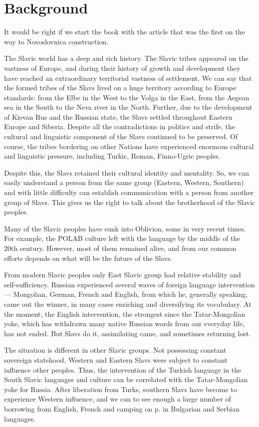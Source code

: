\chapter{Background}

It would be right if we start the book with the article \cite{intro} that was the first on the way to Novoslovnica construction.

The Slavic world has a deep and rich history. The Slavic tribes appeared on the vastness of Europe, and during their history of growth and development they have reached an extraordinary territorial vastness of settlement. We can say that the formed tribes of the Slavs lived on a huge territory according to Europe standards: from the Elbe in the West to the Volga in the East, from the Aegean sea in the South to the Neva river in the North. Further, due to the development of Kievan Rus and the Russian state, the Slavs settled throughout Eastern Europe and Siberia. Despite all the contradictions in politics and strife, the cultural and linguistic component of the Slavs continued to be preserved. Of course, the tribes bordering on other Nations have experienced enormous cultural and linguistic pressure, including Turkic, Roman, Finno-Ugric peoples.

Despite this, the Slavs retained their cultural identity and mentality. So, we can easily understand a person from the same group (Eastern, Western, Southern) and with little difficulty can establish communication with a person from another group of Slavs. This gives us the right to talk about the brotherhood of the Slavic peoples.

Many of the Slavic peoples have sunk into Oblivion, some in very recent times. For example, the POLAB culture left with the language by the middle of the 20th century. However, most of them remained alive, and from our common efforts depends on what will be the future of the Slavs.

From modern Slavic peoples only East Slavic group had relative stability and self-sufficiency. Russian experienced several waves of foreign language intervention — Mongolian, German, French and English, from which he, generally speaking, came out the winner, in many cases enriching and diversifying its vocabulary. At the moment, the English intervention, the strongest since the Tatar-Mongolian yoke, which has withdrawn many native Russian words from our everyday life, has not ended. But Slavs do it, assimilating came, and sometimes returning lost.

The situation is different in other Slavic groups. Not possessing constant sovereign statehood, Western and Eastern Slavs were subject to constant influence other peoples. Thus, the intervention of the Turkish language in the South Slavic languages and culture can be correlated with the Tatar-Mongolian yoke for Russia. After liberation from Turks, southern Slavs have become to experience Western influence, and we can to see enough a large number of borrowing from English, French and camping on p. in Bulgarian and Serbian languages.


